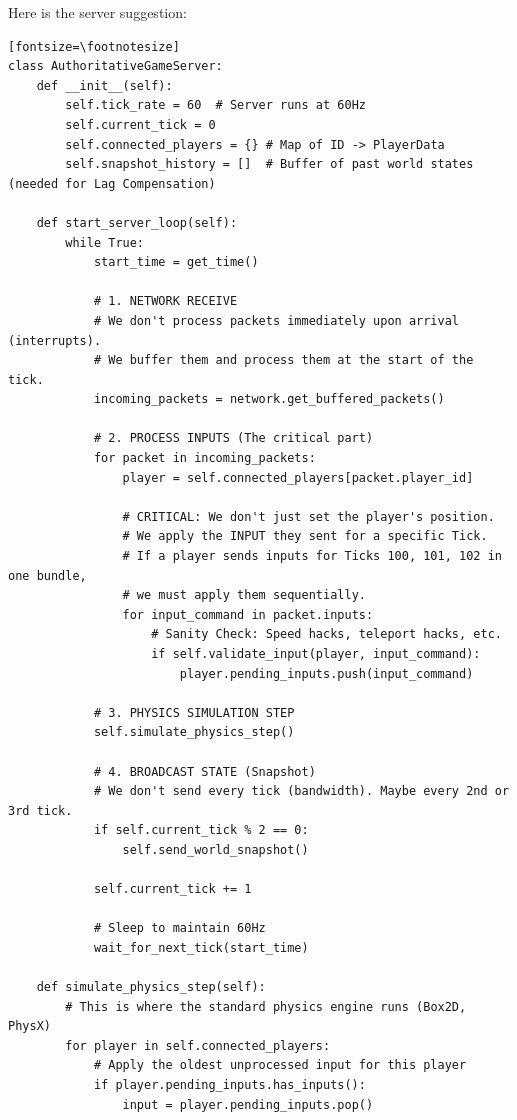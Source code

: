 \documentclass{article}
\begin{document}
\par Here is the server suggestion:
\begin{verbatim}[fontsize=\footnotesize]
class AuthoritativeGameServer:
    def __init__(self):
        self.tick_rate = 60  # Server runs at 60Hz
        self.current_tick = 0
        self.connected_players = {} # Map of ID -> PlayerData
        self.snapshot_history = []  # Buffer of past world states (needed for Lag Compensation)

    def start_server_loop(self):
        while True:
            start_time = get_time()

            # 1. NETWORK RECEIVE
            # We don't process packets immediately upon arrival (interrupts).
            # We buffer them and process them at the start of the tick.
            incoming_packets = network.get_buffered_packets()

            # 2. PROCESS INPUTS (The critical part)
            for packet in incoming_packets:
                player = self.connected_players[packet.player_id]

                # CRITICAL: We don't just set the player's position.
                # We apply the INPUT they sent for a specific Tick.
                # If a player sends inputs for Ticks 100, 101, 102 in one bundle,
                # we must apply them sequentially.
                for input_command in packet.inputs:
                    # Sanity Check: Speed hacks, teleport hacks, etc.
                    if self.validate_input(player, input_command):
                        player.pending_inputs.push(input_command)

            # 3. PHYSICS SIMULATION STEP
            self.simulate_physics_step()

            # 4. BROADCAST STATE (Snapshot)
            # We don't send every tick (bandwidth). Maybe every 2nd or 3rd tick.
            if self.current_tick % 2 == 0:
                self.send_world_snapshot()

            self.current_tick += 1

            # Sleep to maintain 60Hz
            wait_for_next_tick(start_time)

    def simulate_physics_step(self):
        # This is where the standard physics engine runs (Box2D, PhysX)
        for player in self.connected_players:
            # Apply the oldest unprocessed input for this player
            if player.pending_inputs.has_inputs():
                input = player.pending_inputs.pop()


\end{verbatim}
\end{document}
